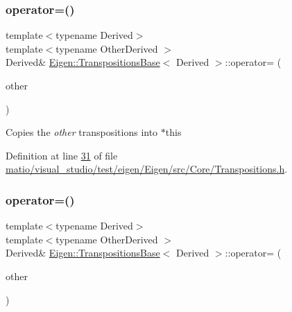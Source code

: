 \subsubsection{\texorpdfstring{operator=()}{operator=()}\hspace{0.1cm}{\footnotesize\ttfamily [1/4]}}
{\footnotesize\ttfamily template$<$typename Derived$>$ \\
template$<$typename Other\+Derived $>$ \\
Derived\& \hyperlink{class_eigen_1_1_transpositions_base}{Eigen\+::\+Transpositions\+Base}$<$ Derived $>$\+::operator= (\begin{DoxyParamCaption}\item[{const \hyperlink{class_eigen_1_1_transpositions_base}{Transpositions\+Base}$<$ Other\+Derived $>$ \&}]{other }\end{DoxyParamCaption})\hspace{0.3cm}{\ttfamily [inline]}}

Copies the {\itshape other} transpositions into {\ttfamily $\ast$this} 

Definition at line \hyperlink{matio_2visual__studio_2test_2eigen_2_eigen_2src_2_core_2_transpositions_8h_source_l00031}{31} of file \hyperlink{matio_2visual__studio_2test_2eigen_2_eigen_2src_2_core_2_transpositions_8h_source}{matio/visual\+\_\+studio/test/eigen/\+Eigen/src/\+Core/\+Transpositions.\+h}.

\mbox{\label{class_eigen_1_1_transpositions_base_a476b5c653c6842e3e4d0104f7f888817}} 
\subsubsection{\texorpdfstring{operator=()}{operator=()}\hspace{0.1cm}{\footnotesize\ttfamily [2/4]}}
{\footnotesize\ttfamily template$<$typename Derived$>$ \\
template$<$typename Other\+Derived $>$ \\
Derived\& \hyperlink{class_eigen_1_1_transpositions_base}{Eigen\+::\+Transpositions\+Base}$<$ Derived $>$\+::operator= (\begin{DoxyParamCaption}\item[{const \hyperlink{class_eigen_1_1_transpositions_base}{Transpositions\+Base}$<$ Other\+Derived $>$ \&}]{other }\end{DoxyParamCaption})\hspace{0.3cm}{\ttfamily [inline]}}

